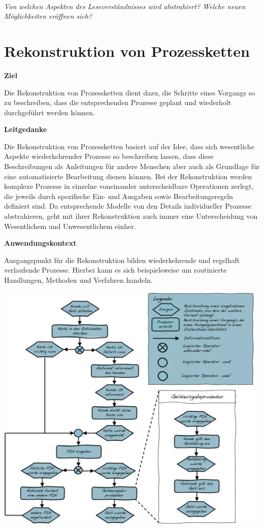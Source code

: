 \documentclass[
  a4paper,
]{book}
\begin{document}
~

\begin{blackbox}
\emph{Von welchen Aspekten des Leseverständnisses wird abstrahiert? Welche neuen Möglichkeiten eröffnen sich?}

\end{blackbox}

\section{Rekonstruktion von Prozessketten}\label{rekonstruktion-von-prozessketten}

\textbf{Ziel}

Die Rekonstruktion von Prozessketten dient dazu, die Schritte eines Vorgangs so zu beschreiben, dass die entsprechenden Prozesse geplant und wiederholt durchgeführt werden können.

\textbf{Leitgedanke}

Die Rekonstruktion von Prozessketten basiert auf der Idee, dass sich wesentliche Aspekte wiederkehrender Prozesse so beschreiben lassen, dass diese Beschreibungen als Anleitungen für andere Menschen aber auch als Grundlage für eine automatisierte Bearbeitung dienen können. Bei der Rekonstruktion werden komplexe Prozesse in einzelne voneinander unterscheidbare Operationen zerlegt, die jeweils durch spezifische Ein- und Ausgaben sowie Bearbeitungsregeln definiert sind. Da entsprechende Modelle von den Details individueller Prozesse abstrahieren, geht mit ihrer Rekonstruktion auch immer eine Unterscheidung von Wesentlichem und Unwesentlichem einher.

\textbf{Anwendungskontext}

Ausgangspunkt für die Rekonstruktion bilden wiederkehrende und regelhaft verlaufende Prozesse. Hierbei kann es sich beispielsweise um routinierte Handlungen, Methoden und Verfahren handeln.

\begin{center}\includegraphics{Figures/09-05-Prozesskette} \end{center}
\end{document}
